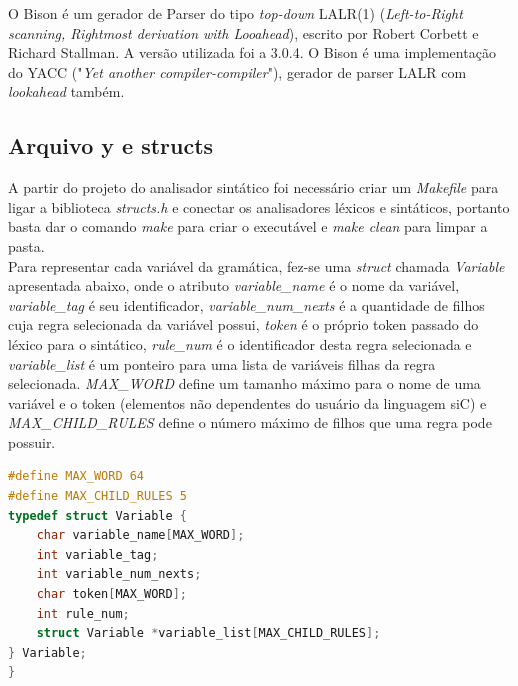 \documentclass[12pt]{article}
\begin{document}
\indent O Bison é um gerador de Parser do tipo \textit{top-down} LALR(1) (\textit{Left-to-Right scanning, Rightmost derivation with Looahead}), escrito por Robert Corbett e Richard Stallman. A versão utilizada foi a 3.0.4. O Bison é uma implementação do YACC ("\textit{Yet another compiler-compiler}"), gerador de parser LALR com \textit{lookahead} também.

\subsection{Arquivo y e structs}

\indent A partir do projeto do analisador sintático foi necessário criar um \textit{Makefile} para ligar a biblioteca \textit{structs.h} e conectar os analisadores léxicos e sintáticos, portanto basta dar o comando \textit{make} para criar o executável e \textit{make clean} para limpar a pasta. \\
\indent Para representar cada variável da gramática, fez-se uma \textit{struct} chamada \textit{Variable} apresentada abaixo, onde o atributo \textit{variable\_name} é o nome da variável, \textit{variable\_tag} é seu identificador, \textit{variable\_num\_nexts} é a quantidade de filhos cuja regra selecionada da variável possui, \textit{token} é o próprio token passado do léxico para o sintático, \textit{rule\_num} é o identificador desta regra selecionada e \textit{variable\_list} é um ponteiro para uma lista de variáveis filhas da regra selecionada. \textit{MAX\_WORD} define um tamanho máximo para o nome de uma variável e o token (elementos não dependentes do usuário da linguagem siC) e \textit{MAX\_CHILD\_RULES} define o número máximo de filhos que uma regra pode possuir. \\
\begin{lstlisting}[language=C]
#define MAX_WORD 64
#define MAX_CHILD_RULES 5
typedef struct Variable {
    char variable_name[MAX_WORD];
    int variable_tag;
    int variable_num_nexts;
    char token[MAX_WORD];
    int rule_num;
    struct Variable *variable_list[MAX_CHILD_RULES];
} Variable;
}
\end{lstlisting}
\end{document}
